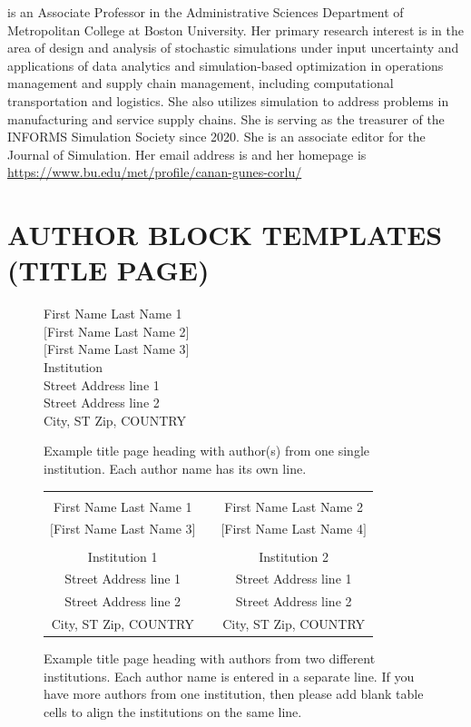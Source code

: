 \documentclass{article}
\begin{document}
 is an Associate Professor in the Administrative Sciences Department of Metropolitan College at Boston University. Her primary research interest is in the area of design and analysis of stochastic simulations under input uncertainty and applications of data analytics and simulation-based optimization in operations management and supply chain management, including computational transportation and logistics. She also utilizes simulation to address problems in manufacturing and service supply chains. She is serving as the treasurer of the INFORMS Simulation Society since 2020. She is an associate editor for the Journal of Simulation. Her email address is  and her homepage is \url{https://www.bu.edu/met/profile/canan-gunes-corlu/}

\newpage

\section*{AUTHOR BLOCK TEMPLATES (TITLE PAGE)}

\begin{figure}[htb]
{
\centering
First Name Last Name 1 \\
$[$First Name Last Name 2$]$ \\
$[$First Name Last Name 3$]$ \\
\vspace{12pt}
Institution \\
Street Address line 1 \\
Street Address line 2 \\
City, ST Zip, COUNTRY
\caption{Example title page heading with author(s) from one single institution. Each author name has its own line. \label{fig: 2 same}}
}
\end{figure}

\begin{figure}[htb]
{
\centering
\begin{tabular}{ccc}
\phantom{Entries to adjust spacing - ignore} & \phantom{intermediate space} & \phantom{Entries to adjust spacing - ignore} \\
First Name Last Name 1 & & First Name Last Name 2 \\
$[$First Name Last Name 3$]$ & & $[$First Name Last Name 4$]$ \\
\\
Institution 1 & & Institution 2 \\
Street Address line 1 & & Street Address line 1 \\
Street Address line 2 & & Street Address line 2 \\
City, ST Zip, COUNTRY & & City, ST Zip, COUNTRY
\end{tabular}
\caption{Example title page heading with authors from two different institutions. Each author name is entered in a separate line. If you have more authors from one institution, then please add blank table cells to align the institutions on the same line. \label{fig: 2 different}}
}
\end{figure}
\end{document}
